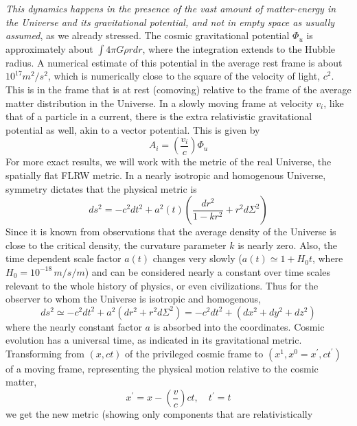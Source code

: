 \documentclass[aps,preprint,12pt,tightenlines]{revtex4}%
\begin{document}
\emph{This dynamics happens in the presence of the vast amount of
matter-energy in the Universe and its gravitational potential, and not in
empty space as usually assumed}, as we already stressed. The cosmic
gravitational potential $\Phi_{u}$ is approximately about $\int{4\pi G\rho
rdr}$, where the integration extends to the Hubble radius. A numerical
estimate of this potential in the average rest frame is about $10^{17}%
m^{2}/s^{2}$, which is numerically close to the square of the velocity of
light, $c^{2}$. This is in the frame that is at rest (comoving) relative to
the frame of the average matter distribution in the Universe. In a slowly
moving frame at velocity $v_{i}$, like that of a particle in a current, there
is the extra relativistic gravitational potential as well, akin to a vector
potential. This is given by
\begin{equation}
A_{i}=\left(  \frac{v_{i}}{c}\right)  \Phi_{u}%
\end{equation}
For more exact results, we will work with the metric of the real Universe, the
spatially flat FLRW metric. In a nearly isotropic and homogenous Universe,
symmetry dictates that the physical metric is
\begin{equation}
ds^{2}=-c^{2}dt^{2}+a^{2}(t)(\frac{dr^{2}}{1-kr^{2}}+r^{2}d\Sigma^{2})
\end{equation}
Since it is known from observations that the average density of the Universe
is close to the critical density, the curvature parameter $k$ is nearly zero.
Also, the time dependent scale factor $a(t)$ changes very slowly
($a(t)\simeq1+H_{0}t$, where $H_{0}=10^{-18}\,m/s/m$) and can be considered
nearly a constant over time scales relevant to the whole history of physics,
or even civilizations. Thus for the observer to whom the Universe is isotropic
and homogenous,
\begin{equation}
ds^{2}\simeq-c^{2}dt^{2}+a^{2}(dr^{2}+r^{2}d\Sigma^{2})=-c^{2}dt^{2}%
+(dx^{2}+dy^{2}+dz^{2})
\end{equation}
where the nearly constant factor $a$ is absorbed into the coordinates. Cosmic
evolution has a universal time, as indicated in its gravitational metric.
Transforming from $(x,ct)$ of the privileged cosmic frame to $(x^{1}%
,x^{0}=x^{\prime},ct^{\prime})$ of a moving frame, representing the physical
motion relative to the cosmic matter,
\begin{equation}
x^{\prime}=x-\left(  \frac{v}{c}\right)  ct,\quad t^{\prime}=t
\end{equation}
we get the new metric (showing only components that are relativistically
\end{document}
